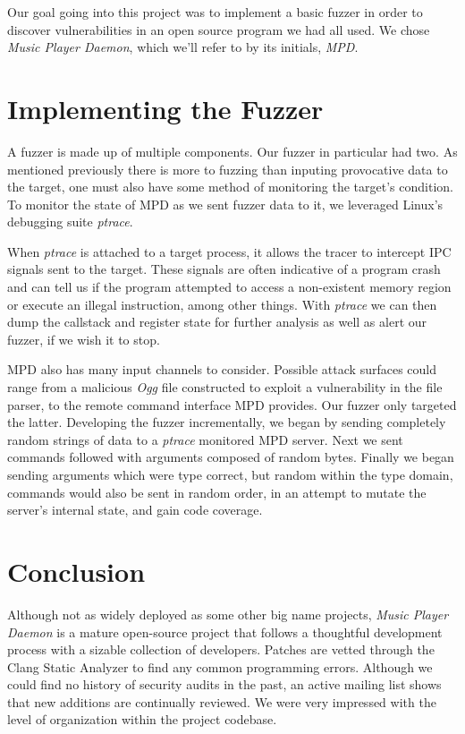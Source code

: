 \documentclass[10pt]{article}
\begin{document}
Our goal going into this project was to implement a basic fuzzer in order to discover vulnerabilities in an open source program we had all used. We chose  \emph{Music Player Daemon}, which we'll refer to by its initials, \emph{MPD}.

\section{Implementing the Fuzzer}
A fuzzer is made up of multiple components. Our fuzzer in particular had two. As mentioned previously there is more to fuzzing than inputing provocative data to the target, one must also have some method of monitoring the target's condition. To monitor the state of MPD as we sent fuzzer data to it, we leveraged Linux's debugging suite \emph{ptrace}. 

When \emph{ptrace} is attached to a target process, it allows the tracer to intercept IPC signals sent to the target. These signals are often indicative of a program crash and can tell us if the program attempted to access a non-existent memory region or execute an illegal instruction, among other things. With \emph{ptrace} we can then dump the callstack and register state for further analysis as well as alert our fuzzer, if we wish it to stop.

MPD also has many input channels to consider. Possible attack surfaces could range from a malicious \emph{Ogg} file constructed to exploit a vulnerability in the file parser, to the remote command interface MPD provides. Our fuzzer only targeted the latter. Developing the fuzzer incrementally, we began by sending completely random strings of data to a \emph{ptrace} monitored MPD server. Next we sent commands followed with arguments composed of random bytes. Finally we began sending arguments which were type correct, but random within the type domain, commands would also be sent in random order, in an attempt to mutate the server's internal state, and gain code coverage.

\section{Conclusion}
Although not as widely deployed as some other big name projects, \emph{Music Player Daemon} is a mature open-source project that follows a thoughtful development process with a sizable collection of developers. Patches are vetted through the Clang Static Analyzer to find any common programming errors. Although we could find no history of security audits in the past, an active mailing list shows that new additions are continually reviewed. We were very impressed with the level of organization within the project codebase.
\end{document}
